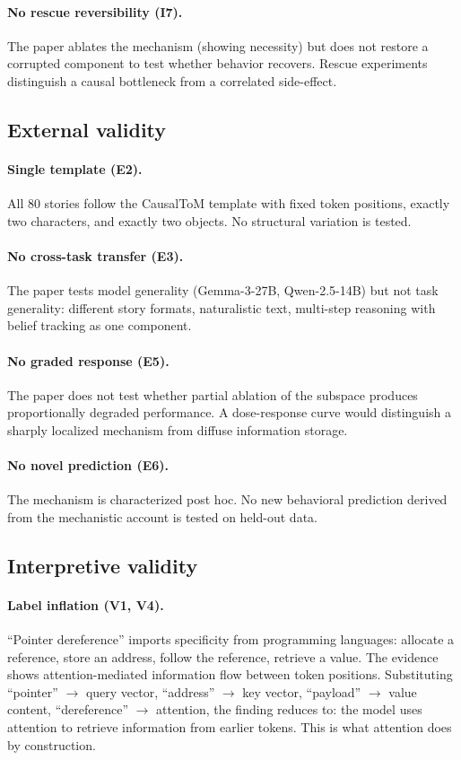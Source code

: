 \documentclass[11pt]{article}
\begin{document}
\paragraph{No rescue reversibility (I7).}
The paper ablates the mechanism (showing necessity) but does not restore a corrupted component to test whether behavior recovers. Rescue experiments distinguish a causal bottleneck from a correlated side-effect.

\subsection{External validity}

\paragraph{Single template (E2).}
All 80 stories follow the CausalToM template with fixed token positions, exactly two characters, and exactly two objects. No structural variation is tested.

\paragraph{No cross-task transfer (E3).}
The paper tests model generality (Gemma-3-27B, Qwen-2.5-14B) but not task generality: different story formats, naturalistic text, multi-step reasoning with belief tracking as one component.

\paragraph{No graded response (E5).}
The paper does not test whether partial ablation of the subspace produces proportionally degraded performance. A dose-response curve would distinguish a sharply localized mechanism from diffuse information storage.

\paragraph{No novel prediction (E6).}
The mechanism is characterized post hoc. No new behavioral prediction derived from the mechanistic account is tested on held-out data.

\subsection{Interpretive validity}

\paragraph{Label inflation (V1, V4).}
``Pointer dereference'' imports specificity from programming languages: allocate a reference, store an address, follow the reference, retrieve a value. The evidence shows attention-mediated information flow between token positions. Substituting ``pointer'' $\rightarrow$ query vector, ``address'' $\rightarrow$ key vector, ``payload'' $\rightarrow$ value content, ``dereference'' $\rightarrow$ attention, the finding reduces to: the model uses attention to retrieve information from earlier tokens. This is what attention does by construction.
\end{document}

